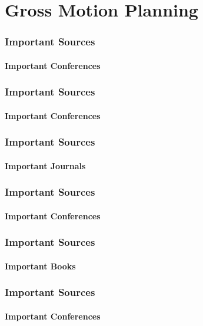 \section{Gross Motion Planning}

\begin{frame}
    \frametitle{Important Sources}
    \framesubtitle{Important Conferences}
\end{frame}

\begin{frame}
    \frametitle{Important Sources}
    \framesubtitle{Important Conferences}
\end{frame}

\begin{frame}
    \frametitle{Important Sources}
    \framesubtitle{Important Journals}
\end{frame}

\begin{frame}
    \frametitle{Important Sources}
    \framesubtitle{Important Conferences}
\end{frame}

\begin{frame}
    \frametitle{Important Sources}
    \framesubtitle{Important Books}
\end{frame}

\begin{frame}
    \frametitle{Important Sources}
    \framesubtitle{Important Conferences}
\end{frame}